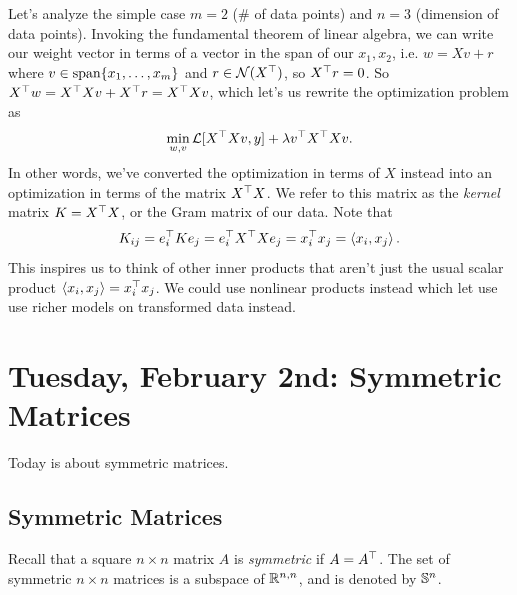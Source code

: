 \documentclass[11 pt]{scrartcl}
\begin{document}
Let's analyze the simple case $m = 2$ (\# of data points) and $n = 3$ (dimension of data points). 
Invoking the fundamental theorem of linear algebra, we can write our weight vector in terms of a vector in the span of our $x_1, x_2$, i.e. $w = Xv + r$ where $v\in \text{span}\{x_1, \dots, x_m\}$ and $r\in \mathcal N(X^\top)$, so $X^\top r = 0$. 
So $X^\top w = X^\top X v+ X^\top r = X^\top X v$, which let's us rewrite the optimization problem as 
\[ 
    \min_{w,v} \mathcal L[X^\top X v, y] + \lambda v^\top X^\top X v.  
\]
In other words, we've converted the optimization in terms of $X$ instead into an optimization in terms of the matrix $X^\top X$. 
We refer to this matrix as the \emph{kernel} matrix $K = X^\top X$, or the Gram matrix of our data. 
Note that 
\[ K_{ij} = e_i^\top K e_j = e_i^\top X^\top X e_j = x_i^\top x_j = \left\langle x_i, x_j \right\rangle.\]
This inspires us to think of other inner products that aren't just the usual scalar product $\left\langle x_i, x_j \right\rangle = x_i^\top x_j$. 
We could use nonlinear products instead which let use use richer models on transformed data instead. 


\newpage
\section{Tuesday, February 2nd: Symmetric Matrices}

Today is about symmetric matrices. 
\subsection{Symmetric Matrices} 
Recall that a square $n\times n$ matrix $A$ is \emph{symmetric} if $A = A^\top$. 
The set of symmetric $n\times n$ matrices is a subspace of $\mathbb R^{n,n}$, and is denoted by $\mathbb S^n$. 
\end{document}
